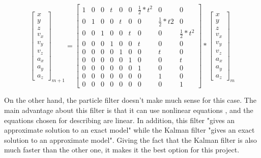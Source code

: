 \begin{equation}
\begin{bmatrix}
x \\ y \\ z \\ v_{x} \\ v_{y} \\ v_{z} \\ a_{x} \\ a_{y} \\ a_{z}
\end{bmatrix}_{m+1}
=
\begin{bmatrix}
1 & 0 & 0 & t & 0 & 0 & \frac{1}{2}*t^{2} & 0 & 0 \\
0 & 1 & 0 & 0 & t & 0 & 0 & \frac{1}{2}*t{2} & 0 \\
0 & 0 & 1 & 0 & 0 & t & 0 & 0 & \frac{1}{2}*t^{2}	\\
0 & 0 & 0 & 1 & 0 & 0 & t & 0 & 0 \\
0 & 0 & 0 & 0 & 1 & 0 & 0 & t & 0 \\
0 & 0 & 0 & 0 & 0 & 1 & 0 & 0 & t \\
0 & 0 & 0 & 0 & 0 & 0 & 1 & 0 & 0 \\
0 & 0 & 0 & 0 & 0 & 0 & 0 & 1 & 0 \\
0 & 0 & 0 & 0 & 0 & 0 & 0 & 0 & 1
\end{bmatrix}
*
\begin{bmatrix}
x \\ y \\ z \\ v_{x} \\ v_{y} \\ v_{z} \\ a_{x} \\ a_{y} \\ a_{z}
\end{bmatrix}_{m}
\label{eq:motion_mat}
\end{equation}

On the other hand, the particle filter doesn't make much sense for this case. The main advantage about this filter is that it can use nonlinear equations \cite{kalman_lectures}, and the equations chosen for describing are linear. In addition, this filter "gives an approximate solution to an exact model" while the Kalman filter "gives an exact solution to an approximate model". Giving the fact that the Kalman filter is also much faster than the other one, it makes it the best option for this project.\\

